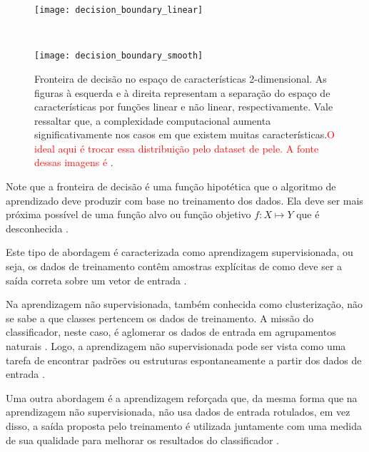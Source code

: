\begin{figure}[h]
    \centering
    \begin{minipage}{0.45\textwidth}
        \texttt{[image: decision\_boundary\_linear]}
        \label{fig:decision_boundary_linear}
    \end{minipage}
    ~ %
    \begin{minipage}{0.45\textwidth}
        \texttt{[image: decision\_boundary\_smooth]}
        \label{fig:decision_boundary_smooth}
    \end{minipage}
    \caption[Fronteira de decisão no espaço de características 2-dimensional]{Fronteira de decisão no espaço de características 2-dimensional. As figuras à esquerda e à direita representam a separação do espaço de características por funções linear e não linear, respectivamente. Vale ressaltar que, a complexidade computacional aumenta significativamente nos casos em que existem muitas características.\textcolor{red}{O ideal aqui é trocar essa distribuição pelo dataset de pele. A fonte dessas imagens é \citet{duda:12}}.}
    \label{fig:decision_boundary}
\end{figure}

Note que a fronteira de decisão é uma função hipotética que o algoritmo de aprendizado deve produzir com base no treinamento dos dados. Ela deve ser mais próxima possível de uma função alvo ou função objetivo $f : X\mapsto Y$ que é desconhecida \citep{mostafa:12}.

Este tipo de abordagem é caracterizada como aprendizagem supervisionada, ou seja, os dados de treinamento contêm amostras explícitas de como deve ser a saída correta sobre um vetor de entrada \citep{mostafa:12}.

Na aprendizagem não supervisionada, também conhecida como clusterização, não se sabe a que classes pertencem os dados de treinamento. A missão do classificador, neste caso, é aglomerar os dados de entrada em agrupamentos naturais \citep{duda:12}. Logo, a aprendizagem não supervisionada pode ser vista como uma tarefa de encontrar padrões ou estruturas espontaneamente a partir dos dados de entrada \citep{mostafa:12}.

Uma outra abordagem é a aprendizagem reforçada que, da mesma forma que na aprendizagem não supervisionada, não usa dados de entrada rotulados, em vez disso, a saída proposta pelo treinamento é utilizada juntamente com uma medida de sua qualidade para melhorar os resultados do classificador \citep{mostafa:12}.

